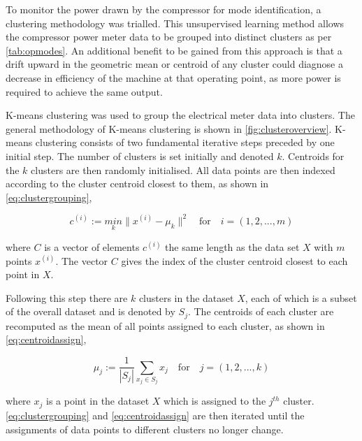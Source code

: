 To monitor the power drawn by the compressor for mode identification, a clustering methodology was trialled. This unsupervised learning method allows the compressor power meter data to be grouped into distinct clusters as per \autoref{tab:opmodes}. An additional benefit to be gained from this approach is that a drift upward in the geometric mean or centroid of any cluster could diagnose a decrease in efficiency of the machine at that operating point, as more power is required to achieve the same output.

K-means clustering was used to group the electrical meter data into clusters. The general methodology of K-means clustering is shown in \autoref{fig:clusteroverview}. K-means clustering consists of two fundamental iterative steps preceded by one initial step. The number of clusters is set initially and denoted $k$. Centroids for the $k$ clusters are then randomly initialised. All data points are then indexed according to the cluster centroid closest to them, as shown in \autoref{eq:clustergrouping},

\begin{equation}
c^{(i)}  := \underset{k}{min}  \lVert {x^{(i)} - \mu_k} \rVert ^2 \quad \text{for} \quad i = (1, 2, ..., m)
\label{eq:clustergrouping}
\end{equation}

where $C$ is a vector of elements $c^{(i)}$ the same length as the data set $X$ with $m$ points $x^{(i)}$. The vector $C$ gives the index of the cluster centroid closest to each point in $X$.

Following this step there are $k$ clusters in the dataset $X$, each of which is a subset of the overall dataset and is denoted by $S_j$. The centroids of each cluster are recomputed as the mean of all points assigned to each cluster, as shown in \autoref{eq:centroidassign},

\begin{equation}
\mu_j := \frac{1}{|S_j|}\sum_{x_j \in S_j} x_j \quad \text{for} \quad j = (1, 2, ..., k)
\label{eq:centroidassign}
\end{equation}

where $x_j$ is a point in the dataset $X$ which is assigned to the $j^{th}$ cluster. \autoref{eq:clustergrouping} and \autoref{eq:centroidassign} are then iterated until the assignments of data points to different clusters no longer change.

